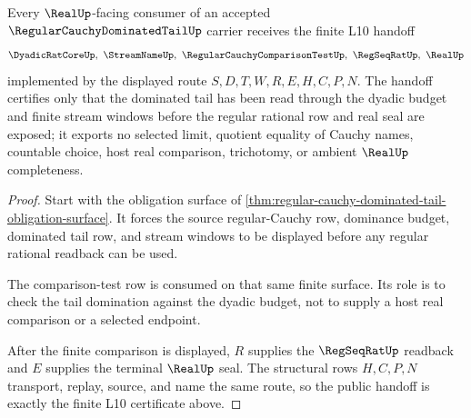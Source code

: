 \begin{theorem}
\label{thm:regular-cauchy-dominated-tail-l10-handoff}
Every $\RealUp$-facing consumer of an accepted $\RegularCauchyDominatedTailUp$ carrier receives the finite L10 handoff
$$
\DyadicRatCoreUp,\ \StreamNameUp,\ \RegularCauchyComparisonTestUp,\ \RegSeqRatUp,\ \RealUp
$$
implemented by the displayed route $S,D,T,W,R,E,H,C,P,N$. The handoff certifies only that the dominated tail has been read through the dyadic budget and finite stream windows before the regular rational row and real seal are exposed; it exports no selected limit, quotient equality of Cauchy names, countable choice, host real comparison, trichotomy, or ambient $\RealUp$ completeness.
\end{theorem}
\begin{proof}
Start with the obligation surface of \autoref{thm:regular-cauchy-dominated-tail-obligation-surface}. It forces the source regular-Cauchy row, dominance budget, dominated tail row, and stream windows to be displayed before any regular rational readback can be used.

The comparison-test row is consumed on that same finite surface. Its role is to check the tail domination against the dyadic budget, not to supply a host real comparison or a selected endpoint.

After the finite comparison is displayed, $R$ supplies the $\RegSeqRatUp$ readback and $E$ supplies the terminal $\RealUp$ seal. The structural rows $H,C,P,N$ transport, replay, source, and name the same route, so the public handoff is exactly the finite L10 certificate above.
\end{proof}


\begin{closurestatus}{\RegularCauchyDominatedTailUp}
  \theoryclosure{\seedClosure}
  \formalstatus{\unformalizedV}
\end{closurestatus}
